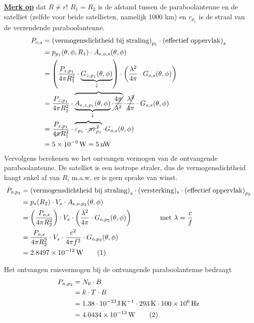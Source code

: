 \documentclass[kulak]{kulakarticle}
\newcommand\numberthis{\addtocounter{equation}{1}\tag{\theequation}}
\begin{document}
	\underline{\textbf{Merk op}} dat \(R\neq r\)! \(R_1=R_2\) is de afstand tussen de paraboolantenne en de satelliet (zelfde voor beide satellieten, namelijk 1000 km) en \(r_{p_1}\) is de straal van de verzendende paraboolantenne.
	\begin{align*}
		P_{o,s} &= \text{(vermogensdichtheid bij straling)}_{p_1} \cdot \text{(effectief oppervlak)}_s \\
		&= p_{p_1}(\theta,\phi,R_1) \cdot A_{e,o,s}(\theta, \phi)\\
		&= \left(\frac{P_{z,p_1}}{4\pi R_1^2}\cdot \underbrace{G_{z,p_1}(\theta,\phi)}_\downarrow \right)\cdot \left(\frac{\lambda^2}{4\pi}\cdot G_{o,s}(\theta, \phi)\right) \\
		&= \frac{P_{z,p_1}}{4\pi R_1^2}\cdot \overbrace{ \underbrace{A_{e,z,p_1}(\theta,\phi)}_\downarrow\cdot \cancel{\frac{4 \pi}{\lambda^2}} } \cdot \cancel{\frac{\lambda^2}{4\pi}}\cdot G_{o,s}(\theta, \phi) \\
		&= \frac{P_{z,p_1}}{4\cancel{\pi} R_1^2}\cdot \overbrace{ \varepsilon_{p_1} \cdot \cancel{\pi} r_{p_1}^2 } \cdot G_{o,s}(\theta, \phi) \\
		&= \SI{5e-9}{\watt} = \SI{5}{\nano\watt}
	\end{align*}
	Vervolgens berekenen we het ontvangen vermogen van de ontvangende paraboolantenne. De satelliet is een isotrope straler, dus de vermogensdichtheid hangt enkel af van \(R\), m.a.w. er is geen sprake van winst.
	\begin{align*}
		P_{o,p_2} &= \text{(vermogensdichtheid bij straling)}_s \cdot (\text{versterking})_s \cdot \text{(effectief oppervlak)}_{p_2} \\
		&= p_{s}(R_2) \cdot V_s \cdot A_{e,o,p_2}(\theta, \phi)\\
		&= \left(\frac{P_{o,s}}{4\pi R_2^2} \right) \cdot V_s \cdot \left(\frac{\lambda^2}{4\pi}\cdot G_{o,p_2}(\theta, \phi)\right) \qquad \qquad \text{met } \lambda = \frac{c}{f} \\
		&= \frac{P_{o,s}}{4\pi R_2^2} \cdot V_s \cdot \frac{c^2}{4\pi f^2}\cdot G_{o,p_2}(\theta, \phi) \\
		&= \SI{2.8497e-12}{\watt} \numberthis \label{ontvangen_vermogen}
	\end{align*}

	Het ontvangen ruisvermogen bij de ontvangende paraboolantenne bedraagt
	\begin{align*}
		P_{n,p_2} &= N_0 \cdot B \\
		&= k \cdot T \cdot B \\
		&= 1.38 \cdot 10^{-23} \unit{\joule\per\kelvin} \cdot \SI{293}{K} \cdot \SI{100e6}{\hertz}\\
		&= \SI{4.0434e-13}{W} \numberthis \label{ruisvermogen}
	\end{align*}
\end{document}
